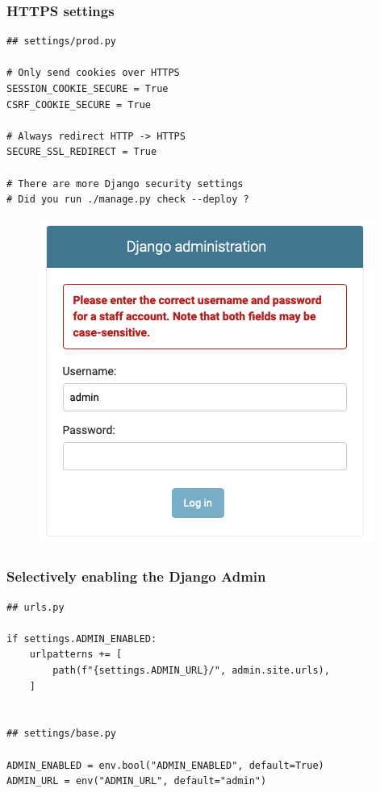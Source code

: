 \documentclass[aspectratio=169]{beamer}
\begin{document}
\begin{frame}[fragile]
\frametitle{HTTPS settings}

{\tiny
\begin{verbatim}
## settings/prod.py

# Only send cookies over HTTPS
SESSION_COOKIE_SECURE = True
CSRF_COOKIE_SECURE = True

# Always redirect HTTP -> HTTPS
SECURE_SSL_REDIRECT = True

# There are more Django security settings
# Did you run ./manage.py check --deploy ?
\end{verbatim}
}

\end{frame}


\begin{frame}
  \begin{figure}[p]
    \centering
    \includegraphics[width=0.4\paperwidth]{images/securing-admin-brute-force.png}
  \end{figure}
\end{frame}


\begin{frame}[fragile]
\frametitle{Selectively enabling the Django Admin}

{\tiny
\begin{verbatim}
## urls.py

if settings.ADMIN_ENABLED:
    urlpatterns += [
        path(f"{settings.ADMIN_URL}/", admin.site.urls),
    ]


## settings/base.py

ADMIN_ENABLED = env.bool("ADMIN_ENABLED", default=True)
ADMIN_URL = env("ADMIN_URL", default="admin")
\end{verbatim}
}

\end{frame}
\end{document}
